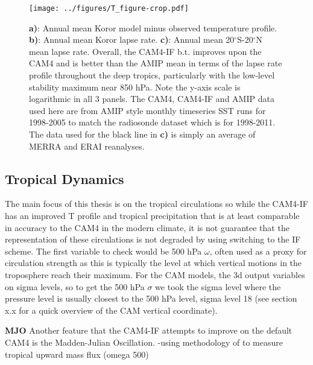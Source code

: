 \documentclass[letterpaper,12pt,titlepage,oneside,final]{book}
\begin{document}
\begin{figure}[H]
\centering
\noindent\texttt{[image: ../figures/T\_figure-crop.pdf]}\hfill
\caption{\textbf{a)}: Annual mean Koror model minus observed temperature profile. \textbf{b)}: Annual mean Koror lapse rate. \textbf{c)}: Annual mean 20$^\circ$S-20$^\circ$N mean lapse rate. Overall, the CAM4-IF b.t. improves upon the CAM4 and is better than the AMIP mean in terms of the lapse rate profile throughout the deep tropics, particularly with the low-level stability maximum near 850 hPa. Note the y-axis scale is logarithmic in all 3 panels. The CAM4, CAM4-IF and AMIP data used here are from AMIP style monthly timeseries SST runs for 1998-2005 to match the radiosonde dataset which is for 1998-2011. The data used for the black line in \textbf{c)} is simply an average of MERRA and ERAI reanalyses.}
\end{figure}

\subsection{Tropical Dynamics}
The main focus of this thesis is on the tropical circulations so while the CAM4-IF has an improved T profile and tropical precipitation that is at least comparable in accuracy to the CAM4 in the modern climate, it is not guarantee that the representation of these circulations is not degraded by using switching to the IF scheme. The first variable to check would be 500 hPa $\omega$, often used as a proxy for circulation strength as this is typically the level at which vertical motions in the troposphere reach their maximum. For the CAM models, the 3d output variables on sigma levels, so to get the 500 hPa $\sigma$ we took the sigma level where the pressure level is usually closest to the 500 hPa level, sigma level 18 (see section x.x for a quick overview of the CAM vertical coordinate). 

\textbf{MJO}
Another feature that the CAM4-IF attempts to improve on the default CAM4 is the Madden-Julian Oscillation. 
-using methodology of \citep{vecchi_global_2007} to measure tropical upward mass flux (omega 500)
\\
\end{document}
